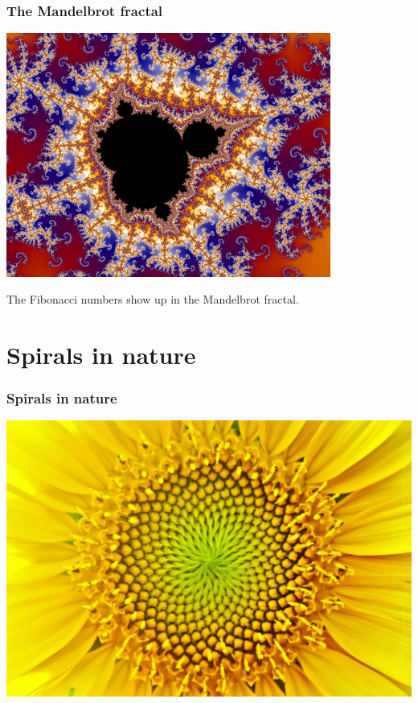 \documentclass[12pt,compress,english,utf8,t]{beamer}
\begin{document}
\begin{frame}\frametitle{The Mandelbrot fractal}
  \centering
  \includegraphics[width=0.8\textwidth]{mandelbrot}
  \medskip
  \pause

  The Fibonacci numbers show up in the Mandelbrot fractal.
  \par
\end{frame}



\section{Spirals in nature}

\begin{frame}\frametitle{Spirals in nature}
  \centering
  \includegraphics[height=0.8\textheight]{sonnenblume2}
  \par
\end{frame}
\end{document}
